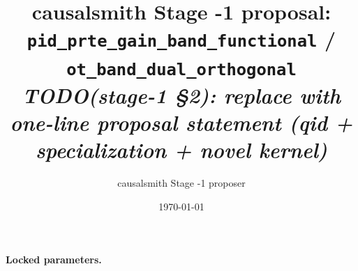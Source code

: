 \documentclass[11pt]{article}
\title{causalsmith Stage -1 proposal: \texttt{pid\_prte\_gain\_band\_functional} / \texttt{ot\_band\_dual\_orthogonal}%
  \\ \large\textit{TODO(stage-1 \S2): replace with one-line proposal statement (qid + specialization + novel kernel)}}
\author{causalsmith Stage -1 proposer}
\date{\today}
\theoremstyle{definition}
\theoremstyle{plain}
\theoremstyle{remark}
\begin{document}
\maketitle


\paragraph{Locked parameters.}

\begin{abstract}
\end{abstract}
\end{document}
